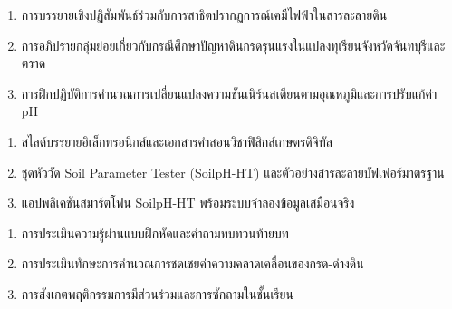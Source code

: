 \begin{tcolorbox}[
    enhanced, breakable,
    colback=white, colframe=rbruNavy,
    fonttitle=\bfseries\color{white},
    title={3. วิธีสอนและกิจกรรมการเรียนการสอน},
    arc=1.5mm, boxrule=0.8pt, leftrule=3.5mm
]
\begin{enumerate}
    \item การบรรยายเชิงปฏิสัมพันธ์ร่วมกับการสาธิตปรากฏการณ์เคมีไฟฟ้าในสารละลายดิน
    \item การอภิปรายกลุ่มย่อยเกี่ยวกับกรณีศึกษาปัญหาดินกรดรุนแรงในแปลงทุเรียนจังหวัดจันทบุรีและตราด
    \item การฝึกปฏิบัติการคำนวณการเปลี่ยนแปลงความชันเนิร์นสเตียนตามอุณหภูมิและการปรับแก้ค่า pH
\end{enumerate}
\end{tcolorbox}

\begin{tcolorbox}[
    enhanced, breakable,
    colback=white, colframe=rbruNavy,
    fonttitle=\bfseries\color{white},
    title={4. สื่อการเรียนการสอน},
    arc=1.5mm, boxrule=0.8pt, leftrule=3.5mm
]
\begin{enumerate}
    \item สไลด์บรรยายอิเล็กทรอนิกส์และเอกสารคำสอนวิชาฟิสิกส์เกษตรดิจิทัล
    \item ชุดหัววัด Soil Parameter Tester (SoilpH-HT) และตัวอย่างสารละลายบัฟเฟอร์มาตรฐาน
    \item แอปพลิเคชันสมาร์ตโฟน SoilpH-HT พร้อมระบบจำลองข้อมูลเสมือนจริง
\end{enumerate}
\end{tcolorbox}

\begin{tcolorbox}[
    enhanced, breakable,
    colback=white, colframe=rbruNavy,
    fonttitle=\bfseries\color{white},
    title={5. การวัดและประเมินผล},
    arc=1.5mm, boxrule=0.8pt, leftrule=3.5mm
]
\begin{enumerate}
    \item การประเมินความรู้ผ่านแบบฝึกหัดและคำถามทบทวนท้ายบท
    \item การประเมินทักษะการคำนวณการชดเชยค่าความคลาดเคลื่อนของกรด-ด่างดิน
    \item การสังเกตพฤติกรรมการมีส่วนร่วมและการซักถามในชั้นเรียน
\end{enumerate}
\end{tcolorbox}

\clearpage

